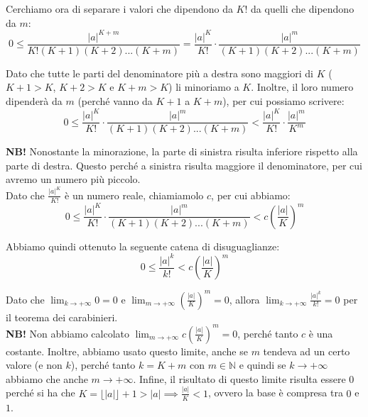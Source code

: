 \documentclass{article}
\begin{document}
\noindent Cerchiamo ora di separare i valori che dipendono da $K!$ da quelli che dipendono da $m$:
\begin{equation*}
    0 \leq \frac{|a|^{K + m}}{K!(K + 1)(K + 2)...(K + m)} = \frac{|a|^K}{K!} \cdot \frac{|a|^m}{(K + 1)(K + 2)...(K + m)}
\end{equation*}

\noindent Dato che tutte le parti del denominatore più a destra sono maggiori di $K$ ($K + 1 > K$, $K + 2 > K$ e $K + m > K$) li minoriamo a $K$. Inoltre, il loro numero dipenderà da $m$ (perché vanno da $K + 1$ a $K + m$), per cui possiamo scrivere:
\begin{equation*}
    0 \leq \frac{|a|^K}{K!} \cdot \frac{|a|^m}{(K + 1)(K + 2)...(K + m)} < \frac{|a|^K}{K!} \cdot \frac{|a|^m}{K^m}
\end{equation*}

\noindent\textbf{NB!} Nonostante la minorazione, la parte di sinistra risulta inferiore rispetto alla parte di destra. Questo perché a sinistra risulta maggiore il denominatore, per cui avremo un numero più piccolo.\\

\noindent Dato che $\frac{|a|^K}{K!}$ è un numero reale, chiamiamolo $c$, per cui abbiamo:
\begin{equation*}
    0 \leq \frac{|a|^K}{K!} \cdot \frac{|a|^m}{(K + 1)(K + 2)...(K + m)} < c \left(\frac{|a|}{K}\right)^m
\end{equation*}

\noindent Abbiamo quindi ottenuto la seguente catena di disuguaglianze:
\begin{equation*}
    0 \leq \frac{|a|^k}{k!} < c \left(\frac{|a|}{K}\right)^m
\end{equation*}

\noindent Dato che $\lim_{k \to +\infty} 0 = 0$ e $\lim_{m \to +\infty} (\frac{|a|}{K})^m = 0$, allora $\lim_{k \to +\infty} \frac{|a|^k}{k!} = 0$ per il teorema dei carabinieri.\\

\noindent\textbf{NB!} Non abbiamo calcolato $\lim_{m \to +\infty} c(\frac{|a|}{K})^m = 0$, perché tanto $c$ è una costante. Inoltre, abbiamo usato questo limite, anche se $m$ tendeva ad un certo valore (e non $k$), perché tanto $k = K + m$ con $m \in \mathbb{N}$ e quindi se $k \to +\infty$ abbiamo che anche $m \to +\infty$. Infine, il risultato di questo limite risulta essere $0$ perché si ha che $K = \lfloor |a| \rfloor + 1 > |a| \implies \frac{|a|}{K} < 1$, ovvero la base è compresa tra $0$ e $1$.\\
\end{document}
